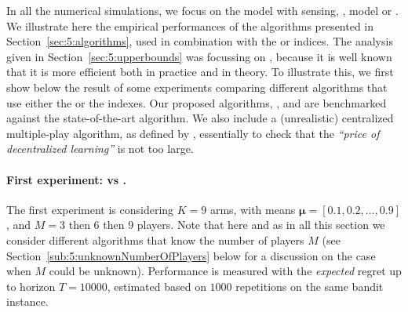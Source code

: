 

In all the numerical simulations, we focus on the model with sensing, \ie, model \modeldeux{} or \modeltrois.
%
We illustrate here the empirical performances of the algorithms presented in Section~\ref{sec:5:algorithms}, used in combination with the \UCB{} or \klUCB{} indices.
The analysis given in Section~\ref{sec:5:upperbounds} was focussing on \klUCB, because it is well known that it is more efficient both in practice and in theory.
To illustrate this, we first show below the result of some experiments comparing different algorithms that use either the \UCB{} or the \klUCB{} indexes.
%
Our proposed algorithms, \MCTopM{}, \RandTopM{} and \Selfish{} are benchmarked against the state-of-the-art \RhoRand{} algorithm.
We also include a (unrealistic) centralized multiple-play \klUCB{} algorithm,
as defined by \cite{Anantharam87a},
essentially to check that the \emph{``price of decentralized learning''} is not too large.


\paragraph{First experiment: \UCB{} vs \klUCB{}.}
%
The first experiment is considering $K=9$ arms, with means $\bm{\mu}=[0.1,0.2,\dots,0.9]$, and $M=3$ then $6$ then $9$ players.
Note that here and as in all this section we consider different algorithms that know the number of players $M$ (see Section~\ref{sub:5:unknownNumberOfPlayers} below for a discussion on the case when $M$ could be unknown).
%
Performance is measured with the \emph{expected} regret up to horizon $T=10000$, estimated based on $1000$ repetitions on the same bandit instance.

